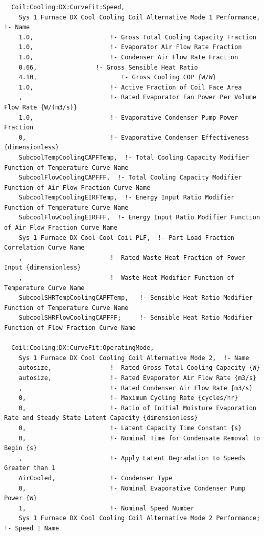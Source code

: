 \begin{lstlisting}
  Coil:Cooling:DX:CurveFit:Speed,
    Sys 1 Furnace DX Cool Cooling Coil Alternative Mode 1 Performance,  !- Name
    1.0,                     !- Gross Total Cooling Capacity Fraction
    1.0,                     !- Evaporator Air Flow Rate Fraction
    1.0,                     !- Condenser Air Flow Rate Fraction
    0.66,                !- Gross Sensible Heat Ratio
    4.10,                       !- Gross Cooling COP {W/W}
    1.0,                     !- Active Fraction of Coil Face Area
    ,                        !- Rated Evaporator Fan Power Per Volume Flow Rate {W/(m3/s)}
    1.0,                     !- Evaporative Condenser Pump Power Fraction
    0,                       !- Evaporative Condenser Effectiveness {dimensionless}
    SubcoolTempCoolingCAPFTemp,  !- Total Cooling Capacity Modifier Function of Temperature Curve Name
    SubcoolFlowCoolingCAPFFF,  !- Total Cooling Capacity Modifier Function of Air Flow Fraction Curve Name
    SubcoolTempCoolingEIRFTemp,  !- Energy Input Ratio Modifier Function of Temperature Curve Name
    SubcoolFlowCoolingEIRFFF,  !- Energy Input Ratio Modifier Function of Air Flow Fraction Curve Name
    Sys 1 Furnace DX Cool Cool Coil PLF,  !- Part Load Fraction Correlation Curve Name
    ,                        !- Rated Waste Heat Fraction of Power Input {dimensionless}
    ,                        !- Waste Heat Modifier Function of Temperature Curve Name
    SubcoolSHRTempCoolingCAPFTemp,   !- Sensible Heat Ratio Modifier Function of Temperature Curve Name
    SubcoolSHRFlowCoolingCAPFFF;     !- Sensible Heat Ratio Modifier Function of Flow Fraction Curve Name

  Coil:Cooling:DX:CurveFit:OperatingMode,
    Sys 1 Furnace DX Cool Cooling Coil Alternative Mode 2,  !- Name
    autosize,                !- Rated Gross Total Cooling Capacity {W}
    autosize,                !- Rated Evaporator Air Flow Rate {m3/s}
    ,                        !- Rated Condenser Air Flow Rate {m3/s}
    0,                       !- Maximum Cycling Rate {cycles/hr}
    0,                       !- Ratio of Initial Moisture Evaporation Rate and Steady State Latent Capacity {dimensionless}
    0,                       !- Latent Capacity Time Constant {s}
    0,                       !- Nominal Time for Condensate Removal to Begin {s}
    ,                        !- Apply Latent Degradation to Speeds Greater than 1
    AirCooled,               !- Condenser Type
    0,                       !- Nominal Evaporative Condenser Pump Power {W}
    1,                       !- Nominal Speed Number
    Sys 1 Furnace DX Cool Cooling Coil Alternative Mode 2 Performance;  !- Speed 1 Name


\end{lstlisting}
